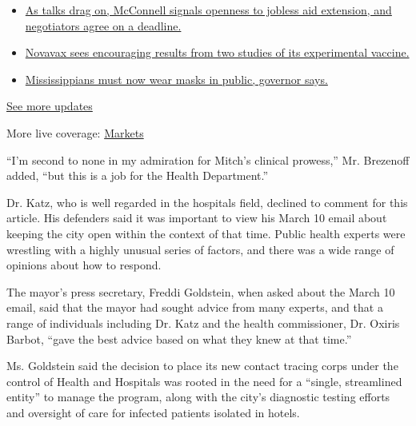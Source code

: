 \begin{itemize}
\tightlist
\item
  \href{https://www.nytimes.com/2020/08/04/world/coronavirus-cases.html?action=click\&pgtype=Article\&state=default\&region=MAIN_CONTENT_1\&context=storylines_live_updates\#link-762df92}{As
  talks drag on, McConnell signals openness to jobless aid extension,
  and negotiators agree on a deadline.}
\item
  \href{https://www.nytimes.com/2020/08/04/world/coronavirus-cases.html?action=click\&pgtype=Article\&state=default\&region=MAIN_CONTENT_1\&context=storylines_live_updates\#link-1228a480}{Novavax
  sees encouraging results from two studies of its experimental
  vaccine.}
\item
  \href{https://www.nytimes.com/2020/08/04/world/coronavirus-cases.html?action=click\&pgtype=Article\&state=default\&region=MAIN_CONTENT_1\&context=storylines_live_updates\#link-794484ed}{Mississippians
  must now wear masks in public, governor says.}
\end{itemize}

\href{https://www.nytimes.com/2020/08/04/world/coronavirus-cases.html?action=click\&pgtype=Article\&state=default\&region=MAIN_CONTENT_1\&context=storylines_live_updates}{See
more updates}

More live coverage:
\href{https://www.nytimes.com/live/2020/08/04/business/stock-market-today-coronavirus?action=click\&pgtype=Article\&state=default\&region=MAIN_CONTENT_1\&context=storylines_live_updates}{Markets}

``I'm second to none in my admiration for Mitch's clinical prowess,''
Mr. Brezenoff added, ``but this is a job for the Health Department.''

Dr. Katz, who is well regarded in the hospitals field, declined to
comment for this article. His defenders said it was important to view
his March 10 email about keeping the city open within the context of
that time. Public health experts were wrestling with a highly unusual
series of factors, and there was a wide range of opinions about how to
respond.

The mayor's press secretary, Freddi Goldstein, when asked about the
March 10 email, said that the mayor had sought advice from many experts,
and that a range of individuals including Dr. Katz and the health
commissioner, Dr. Oxiris Barbot, ``gave the best advice based on what
they knew at that time.''

Ms. Goldstein said the decision to place its new contact tracing corps
under the control of Health and Hospitals was rooted in the need for a
``single, streamlined entity'' to manage the program, along with the
city's diagnostic testing efforts and oversight of care for infected
patients isolated in hotels.

